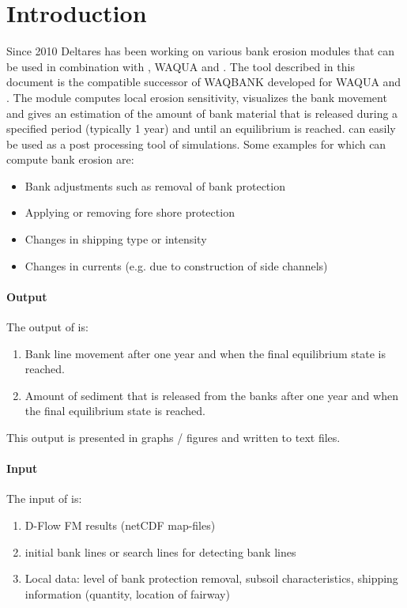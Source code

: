 \chapter{Introduction}

Since 2010 Deltares has been working on various bank erosion modules that can be used in combination with \dflow, WAQUA and \dflowfm.
The \dfastbe tool described in this document is the \dflowfm compatible successor of WAQBANK developed for WAQUA and \dflow.
The module computes local erosion sensitivity, visualizes the bank movement and gives an estimation of the amount of bank material that is released during a specified period (typically 1 year) and until an equilibrium is reached.
\dfastbe can easily be used as a post processing tool of \dflowfm simulations.
Some examples for which \dfastbe can compute bank erosion are:

\begin{itemize}
\item Bank adjustments such as removal of bank protection
\item Applying or removing fore shore protection
\item Changes in shipping type or intensity
\item Changes in currents (e.g. due to construction of side channels)
\end{itemize}

\subsubsection*{Output}
The output of \dfastbe is:

\begin{enumerate}
\item Bank line movement after one year and when the final equilibrium state is reached.
\item Amount of sediment that is released from the banks after one year and when the final equilibrium state is reached.
\end{enumerate}

This output is presented in graphs / figures and written to text files.

\subsubsection*{Input}
The input of \dfastbe is:

\begin{enumerate}
\item D-Flow FM results (netCDF map-files)
\item initial bank lines or search lines for detecting bank lines
\item Local data: level of bank protection removal, subsoil characteristics, shipping information (quantity, location of fairway)
\end{enumerate}

